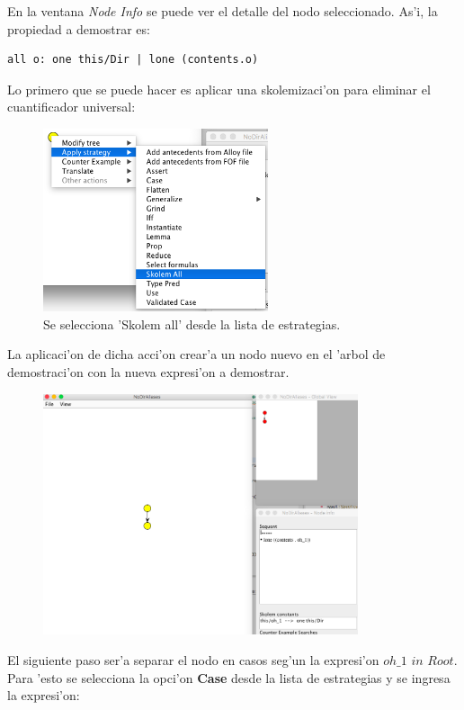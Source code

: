 En la ventana \textit{Node Info} se puede ver el detalle del nodo seleccionado. As'i, la propiedad a demostrar es:

\begin{verbatim}
all o: one this/Dir | lone (contents.o)
\end{verbatim}

Lo primero que se puede hacer es aplicar una skolemizaci'on para eliminar el cuantificador universal:

\begin{figure}[H]
	\includegraphics[width=250px]{img/ejemplo/4.png}
	\centering
	\caption{Se selecciona 'Skolem all' desde la lista de estrategias.}
\end{figure}

La aplicaci'on de dicha acci'on crear'a un nodo nuevo en el 'arbol de demostraci'on con la nueva expresi'on a demostrar.

\begin{figure}[H]
	\includegraphics[width=350px]{img/ejemplo/5.png}
	\centering
	\caption{}
\end{figure}

El siguiente paso ser'a separar el nodo en casos seg'un la expresi'on $oh\_1$ $in$ $Root$. Para 'esto se selecciona la opci'on \textbf{Case} desde la lista de estrategias y se ingresa la expresi'on:

